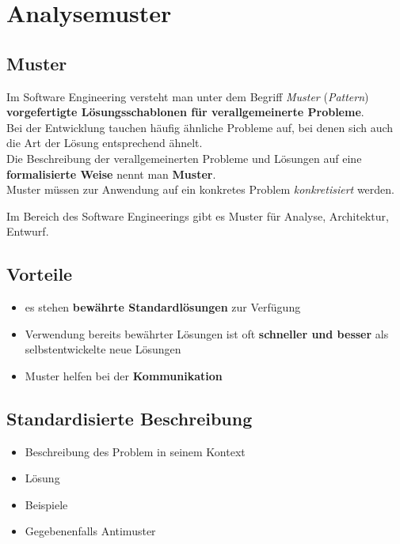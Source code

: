 \section{Analysemuster}

\subsection*{Muster}
Im Software Engineering versteht man unter dem Begriff \textit{Muster} (\textit{Pattern}) \textbf{vorgefertigte Lösungsschablonen für verallgemeinerte Probleme}.\\

\noindent
Bei der Entwicklung tauchen häufig ähnliche Probleme auf, bei denen sich auch die Art der Lösung entsprechend ähnelt.\\

\noindent
Die Beschreibung der verallgemeinerten Probleme und Lösungen auf eine \textbf{formalisierte Weise} nennt man \textbf{Muster}.\\

\noindent
Muster müssen zur Anwendung auf ein konkretes Problem \textit{konkretisiert} werden.

Im Bereich des Software Engineerings gibt es Muster für Analyse, Architektur, Entwurf.

\subsection*{Vorteile}

\begin{itemize}
    \item es stehen \textbf{bewährte Standardlösungen} zur Verfügung
    \item Verwendung bereits bewährter Lösungen ist oft \textbf{schneller und besser} als selbstentwickelte neue Lösungen
    \item Muster helfen bei der \textbf{Kommunikation}
\end{itemize}


\subsection*{Standardisierte Beschreibung}

\begin{itemize}
    \item Beschreibung des Problem in seinem Kontext
    \item Lösung
    \item Beispiele
    \item Gegebenenfalls Antimuster
\end{itemize}

